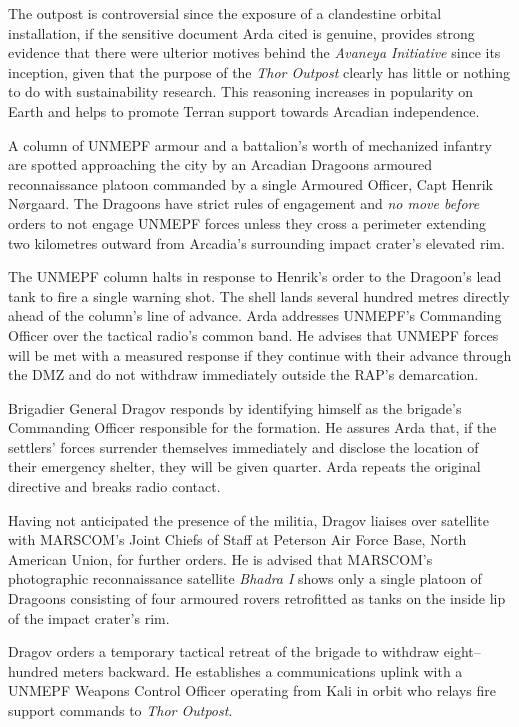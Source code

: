 The outpost is controversial since the exposure of a clandestine orbital installation, if the sensitive document Arda cited is genuine, provides strong evidence that there were ulterior motives behind the {\it Avaneya Initiative} since its inception, given that the purpose of the {\it Thor Outpost} clearly has little or nothing to do with sustainability research. This reasoning increases in popularity on Earth and helps to promote Terran support towards Arcadian independence.
\StopTimelineDate

A column of UNMEPF armour and a battalion's worth of mechanized infantry are spotted approaching the city by an Arcadian Dragoons armoured reconnaissance platoon commanded by a single Armoured Officer, Capt Henrik Nørgaard. The Dragoons have strict rules of engagement and {\it no move before} orders to not engage UNMEPF forces unless they cross a perimeter extending two kilometres outward from Arcadia's surrounding impact crater's elevated rim.

The UNMEPF column halts in response to Henrik's order to the Dragoon's lead tank to fire a single warning shot. The shell lands several hundred metres directly ahead of the column's line of advance. Arda addresses UNMEPF's Commanding Officer over the tactical radio's common band. He advises that UNMEPF forces will be met with a measured response if they continue with their advance through the DMZ and do not withdraw immediately outside the RAP's demarcation. 

Brigadier General Dragov responds by identifying himself as the brigade's Commanding Officer responsible for the formation. He assures Arda that, if the settlers' forces surrender themselves immediately and disclose the location of their emergency shelter, they will be given quarter. Arda repeats the original directive and breaks radio contact.

Having not anticipated the presence of the militia, Dragov liaises over satellite with MARSCOM's Joint Chiefs of Staff at Peterson Air Force Base, North American Union, for further orders. He is advised that MARSCOM's photographic reconnaissance satellite {\it Bhadra I} shows only a single platoon of Dragoons consisting of four armoured rovers retrofitted as tanks on the inside lip of the impact crater's rim. 

Dragov orders a temporary tactical retreat of the brigade to withdraw eight--hundred meters backward. He establishes a communications uplink with a UNMEPF Weapons Control Officer operating from Kali in orbit who relays fire support commands to {\it Thor Outpost}.
\StopTimelineDate

